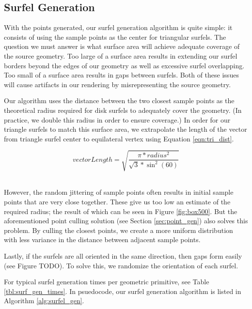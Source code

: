 \subsection{Surfel Generation}
\label{sec:surfel_gen}

With the points generated, our surfel generation algorithm is quite simple: it consists of using the sample points as the center for triangular surfels. The question we must answer is what surface area will achieve adequate coverage of the source geometry. Too large of a surface area results in extending our surfel borders beyond the edges of our geometry as well as excessive surfel overlapping. Too small of a surface area results in gaps between surfels. Both of these issues will cause artifacts in our rendering by misrepresenting the source geometry.

Our algorithm uses the distance between the two closest sample points as the theoretical radius required for disk surfels to adequately cover the geometry. (In practice, we double this radius in order to ensure coverage.) In order for our triangle surfels to match this surface area, we extrapolate the length of the vector from triangle surfel center to equilateral vertex using Equation \ref{eqn:tri_dist}.

\begin{equation}
vectorLength = \sqrt{ \frac{ \pi * radius^2 }{ \sqrt{3} * \sin^2(60) } }
\label{eqn:tri_dist}
\end{equation}
~

However, the random jittering of sample points often results in initial sample points that are very close together. These give us too low an estimate of the required radius; the result of which can be seen in Figure \ref{fig:box500}. But the aforementioned point culling solution (see Section \ref{sec:point_gen}) also solves this problem. By culling the closest points, we create a more uniform distribution with less variance in the distance between adjacent sample points.

Lastly, if the surfels are all oriented in the same direction, then gaps form easily (see Figure TODO). To solve this, we randomize the orientation of each surfel.

For typical surfel generation times per geometric primitive, see Table \ref{tbl:surf_gen_times}. In psuedocode, our surfel generation algorithm is listed in Algorithm \ref{alg:surfel_gen}.

